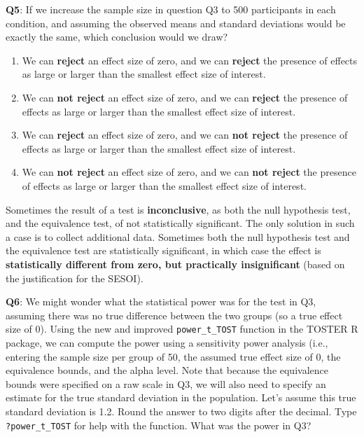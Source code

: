 \documentclass[
  oneside]{krantz}
\providecommand{\tightlist}{%
  \setlength{\itemsep}{0pt}\setlength{\parskip}{0pt}}
\begin{document}
\textbf{Q5}: If we increase the sample size in question Q3 to 500 participants in each condition, and assuming the observed means and standard deviations would be exactly the same, which conclusion would we draw?

\begin{enumerate}
\def\labelenumi{\Alph{enumi})}
\tightlist
\item
  We can \textbf{reject} an effect size of zero, and we can \textbf{reject} the presence of effects as large or larger than the smallest effect size of interest.
\item
  We can \textbf{not reject} an effect size of zero, and we can \textbf{reject} the presence of effects as large or larger than the smallest effect size of interest.
\item
  We can \textbf{reject} an effect size of zero, and we can \textbf{not reject} the presence of effects as large or larger than the smallest effect size of interest.
\item
  We can \textbf{not reject} an effect size of zero, and we can \textbf{not reject} the presence of effects as large or larger than the smallest effect size of interest.
\end{enumerate}

Sometimes the result of a test is \textbf{inconclusive}, as both the null hypothesis test, and the equivalence test, of not statistically significant. The only solution in such a case is to collect additional data. Sometimes both the null hypothesis test and the equivalence test are statistically significant, in which case the effect is \textbf{statistically different from zero, but practically insignificant} (based on the justification for the SESOI).

\textbf{Q6}: We might wonder what the statistical power was for the test in Q3, assuming there was no true difference between the two groups (so a true effect size of 0). Using the new and improved \texttt{power\_t\_TOST} function in the TOSTER R package, we can compute the power using a sensitivity power analysis (i.e., entering the sample size per group of 50, the assumed true effect size of 0, the equivalence bounds, and the alpha level. Note that because the equivalence bounds were specified on a raw scale in Q3, we will also need to specify an estimate for the true standard deviation in the population. Let's assume this true standard deviation is 1.2. Round the answer to two digits after the decimal. Type \texttt{?power\_t\_TOST} for help with the function. What was the power in Q3?
\end{document}
